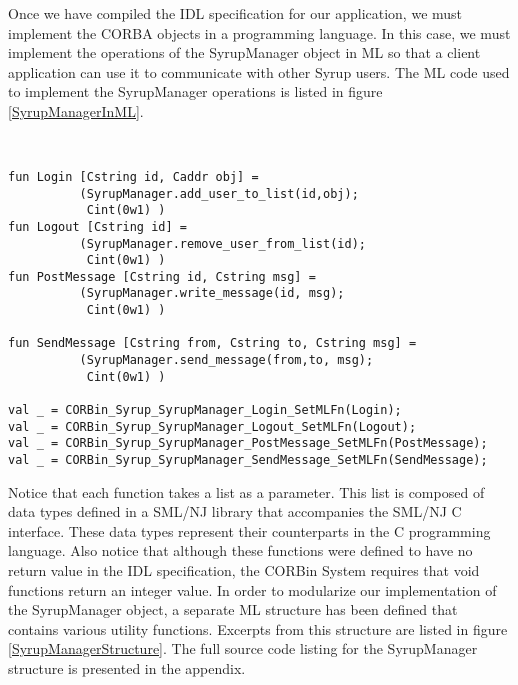 Once we have compiled the IDL specification for our application, we must 
implement the CORBA objects in a programming language.  In this case, we
must implement the operations of the SyrupManager object in ML so that 
a client application can use it to communicate with other Syrup users. 
The ML code used to implement the SyrupManager operations is listed in 
figure \ref{SyrupManagerInML}. 
\begin{figure*}[t]
\singlespace
\begin{verbatim}


fun Login [Cstring id, Caddr obj] = 
          (SyrupManager.add_user_to_list(id,obj);
           Cint(0w1) )
fun Logout [Cstring id] = 
          (SyrupManager.remove_user_from_list(id);
           Cint(0w1) )
fun PostMessage [Cstring id, Cstring msg] = 
          (SyrupManager.write_message(id, msg);
           Cint(0w1) )

fun SendMessage [Cstring from, Cstring to, Cstring msg] = 
          (SyrupManager.send_message(from,to, msg);
           Cint(0w1) )

val _ = CORBin_Syrup_SyrupManager_Login_SetMLFn(Login);
val _ = CORBin_Syrup_SyrupManager_Logout_SetMLFn(Logout);
val _ = CORBin_Syrup_SyrupManager_PostMessage_SetMLFn(PostMessage);
val _ = CORBin_Syrup_SyrupManager_SendMessage_SetMLFn(SendMessage);

\end{verbatim}
\doublespace
\caption {{\em SyrupManager Implementation in ML}.}
\figline
        \label{SyrupManagerInML}
\end{figure*}
Notice that each function takes a list as a parameter.  This list is 
composed of data types defined in a SML/NJ library that accompanies the 
SML/NJ C interface.  These data types represent their counterparts in the 
C programming language.  Also notice that although these functions were defined 
to have no return value in the IDL specification, the CORBin System requires 
that void functions return an integer value.  In order to modularize 
our implementation of the SyrupManager object, a separate ML structure has 
been defined that contains various utility functions.  Excerpts from this 
structure are listed in figure \ref{SyrupManagerStructure}.  The full 
source code listing for the SyrupManager structure is presented in the 
appendix.   
